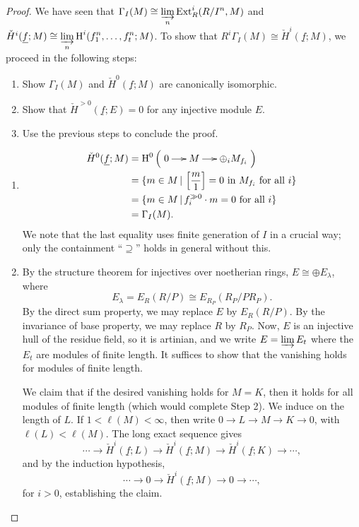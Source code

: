 \documentclass[11pt]{book}
\numberwithin{equation}{section}
\numberwithin{theorem}{chapter}
\theoremstyle{definition}
\newtheorem*{basic properties}{Basic Properties}
\newtheorem*{Important Remark}{Important Remark}
\theoremstyle{remark}
\newcommand{\Ext}{\operatorname{Ext}}
\renewcommand{\H}{\operatorname{H}}
\begin{document}
\begin{proof}
	We have seen that $\Gamma_I(M) \cong \displaystyle\varinjlim_n \Ext^i_R(R/I^n,M)$ and $\check{H}^i(\underline{f};M) \cong \displaystyle\varinjlim_n \H^i (f_1^n, \ldots, f_t^n;M)$. To show that $R^i\Gamma_I(M) \cong \check{H}^i(\underline{f};M)$, we proceed in the following steps:
	\begin{enumerate}[Step 1:]
		\item Show $\Gamma_I(M)$ and $\check{H}^0(\underline{f};M)$ are canonically isomorphic.
		\item Show that $\check{H}^{>0}(\underline{f};E) = 0$ for any injective module $E$.
		\item Use the previous steps to conclude the proof.
	\end{enumerate}
	\begin{enumerate}
		\item 
		\begin{align*}
			\check{H}^0(\underline{f};M) & = \H^0 \left( \xymatrix@C=5mm{0 \ar[r] & M \ar[r] & \oplus_i M_{f_i}} \right) \\
			& = \lbrace m \in M \, | \, \left[ \frac{m}{1} \right] = 0 \textrm{ in } M_{f_i} \text{ for all } i \rbrace \\
			& = \lbrace m \in M \, | \, f_i^{\gg 0} \cdot m = 0  \text{ for all } i \rbrace \\
			& = \Gamma_I(M).
		\end{align*}
		We note that the last equality uses finite generation of $I$ in a crucial way; only the containment ``$\supseteq$'' holds in general without this.
		\item By the structure theorem for injectives over noetherian rings, $E \cong \oplus E_\lambda$, where 
		$$E_{\lambda} = E_R(R/P) \cong E_{R_P} \left( R_P / P R_P \right).$$
		By the direct sum property, we may replace $E$ by $E_R(R/P)$.
	By the invariance of base property, we may replace $R$ by $R_P$. Now, $E$ is an injective hull of the residue field, so it is artinian, and we write $E = \varinjlim E_t$ where the $E_t$ are modules of finite length. It suffices to show that the vanishing holds for modules of finite length.
	
	We claim that if the desired vanishing holds for $M=K$, then it holds for all modules of finite length (which would complete Step 2).
	We induce on the length of $L$. If $1<\ell(M)<\infty$, then write $0\to L \to M \to K\to 0$, with $\ell(L)<\ell(M)$. The long exact sequence gives
	\[\cdots \to \check{H}^i(\underline{f};L) \to \check{H}^i(\underline{f};M) \to \check{H}^i(\underline{f};K) \to \cdots,\]
	and by the induction hypothesis,
		\[\cdots \to 0 \to \check{H}^i(\underline{f};M) \to 0 \to \cdots,\]
		for $i>0$, establishing the claim.
		

\end{enumerate}
\end{proof}
\end{document}
